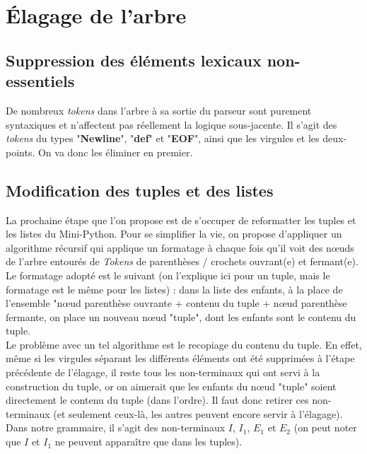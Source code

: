 \documentclass[a4paper, 12pt]{report}
\begin{document}
\section{Élagage de l'arbre}

\subsection{Suppression des éléments lexicaux non-essentiels}

De nombreux \textit{tokens} dans l'arbre à sa sortie du parseur sont purement syntaxiques et n'affectent pas réellement la logique sous-jacente. Il s'agit des \textit{tokens} du types "\textbf{Newline}", "\textbf{def}" et "\textbf{EOF}", ainsi que les virgules et les deux-points. On va donc les éliminer en premier.\\

\subsection{Modification des tuples et des listes}

La prochaine étape que l'on propose est de s'occuper de reformatter les tuples et les listes du Mini-Python. Pour se simplifier la vie, on propose d'appliquer un algorithme récursif qui applique un formatage à chaque fois qu'il voit des n{\oe}uds de l'arbre entourés de \textit{Tokens} de parenthèses / crochets ouvrant(e) et fermant(e).\\

Le formatage adopté est le suivant (on l'explique ici pour un tuple, mais le formatage est le même pour les listes) : dans la liste des enfants, à la place de l'ensemble "n{\oe}ud parenthèse ouvrante + contenu du tuple + n{\oe}ud parenthèse fermante, on place un nouveau n{\oe}ud "tuple", dont les enfants sont le contenu du tuple.\\

Le problème avec un tel algorithme est le recopiage du contenu du tuple. En effet, même si les virgules séparant les différents éléments ont été supprimées à l'étape précédente de l'élagage, il reste tous les non-terminaux qui ont servi à la construction du tuple, or on aimerait que les enfants du n{\oe}ud "tuple" soient directement le contenu du tuple (dans l'ordre). Il faut donc retirer ces non-terminaux (et seulement ceux-là, les autres peuvent encore servir à l'élagage). Dans notre grammaire, il s'agit des non-terminaux $I$, $I_1$, $E_1$ et $E_2$ (on peut noter que $I$ et $I_1$ ne peuvent apparaître que dans les tuples).\\
\end{document}
